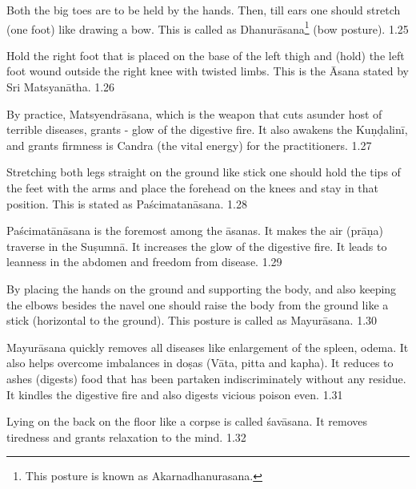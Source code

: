 
Both the big toes are to be held by the hands. Then, till ears one should stretch (one foot)  like drawing a bow. This is called as Dhanurāsana\footnote{This posture is known as Akarnadhanurasana.} (bow posture). 1.25


Hold the right foot that is placed on the base of the left thigh and (hold) the left foot wound outside the right knee with twisted limbs. This is the Āsana stated by Sri Matsyanātha. 1.26


By practice, Matsyendrāsana, which is the weapon that cuts asunder host of terrible diseases, grants - glow of the digestive fire. It also awakens the  Kuṇḍalinī, and grants firmness is Candra (the vital energy) for the practitioners. 1.27
\medskip


Stretching both legs straight on the ground like stick one should hold the tips of the feet with the arms and place the forehead on the knees and stay in that position. This is stated as Paścimatanāsana.  1.28



Paścimatānāsana is the foremost among the āsanas. It makes the air (prāṇa) traverse in the Suṣumnā. It increases the glow of the digestive fire. It leads to leanness in the abdomen and freedom from disease.  1.29
\medskip


By placing the hands on the ground and supporting the body, and also keeping the elbows besides the navel one should raise the body from the ground like a stick (horizontal to the ground). This posture is called as Mayurāsana.  1.30


Mayurāsana quickly removes all diseases like enlargement of the spleen, odema. It also helps overcome imbalances in doṣas (Vāta, pitta and kapha). It reduces to ashes (digests) food that has been partaken indiscriminately without any residue. It kindles the digestive fire and also digests vicious poison even. 1.31
\medskip


Lying on the back on the floor like a corpse is called śavāsana. It removes tiredness and grants relaxation to the mind. 1.32

